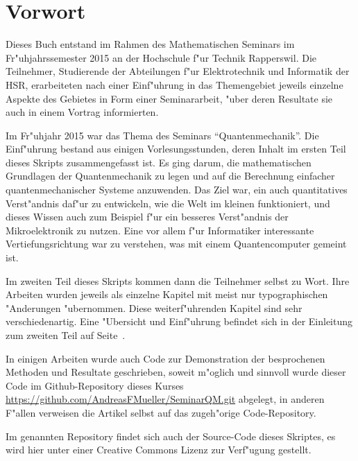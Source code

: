 \chapter*{Vorwort}
\rhead{}
Dieses Buch entstand im Rahmen des Mathematischen Seminars
im Fr"uhjahrssemester 2015 an der Hochschule f"ur Technik Rapperswil.
Die Teilnehmer, Studierende der Abteilungen f"ur Elektrotechnik und
Informatik der
HSR, erarbeiteten nach einer Einf"uhrung in das Themengebiet jeweils
einzelne Aspekte des Gebietes in Form einer Seminararbeit, "uber
deren Resultate sie auch in einem Vortrag informierten. 

Im Fr"uhjahr 2015 war das Thema des Seminars ``Quantenmechanik''.
Die Einf"uhrung bestand aus einigen Vorlesungsstunden, deren
Inhalt im ersten Teil dieses Skripts zusammengefasst ist.
Es ging darum, die mathematischen Grundlagen der Quantenmechanik zu
legen und auf die Berechnung einfacher quantenmechanischer 
Systeme anzuwenden. Das Ziel war, ein auch quantitatives Verst"andnis
daf"ur zu entwickeln, wie die Welt im kleinen funktioniert, und 
dieses Wissen auch zum Beispiel f"ur ein besseres Verst"andnis der
Mikroelektronik zu nutzen. Eine vor allem f"ur Informatiker interessante
Vertiefungsrichtung war zu verstehen, was mit einem Quantencomputer
gemeint ist.

Im zweiten Teil dieses Skripts kommen dann die Teilnehmer
selbst zu Wort. Ihre Arbeiten wurden jeweils als einzelne
Kapitel mit meist nur typographischen "Anderungen "ubernommen.
Diese weiterf"uhrenden Kapitel sind sehr verschiedenartig.
Eine "Ubersicht und Einf"uhrung befindet sich in der Einleitung
zum zweiten Teil auf Seite~\pageref{skript:uebersicht}.

In einigen Arbeiten wurde auch Code zur Demonstration der 
besprochenen Methoden und Resultate geschrieben, soweit
m"oglich und sinnvoll wurde dieser Code im Github-Repository
dieses Kurses \url{https://github.com/AndreasFMueller/SeminarQM.git}
abgelegt, in anderen F"allen verweisen die Artikel selbst auf
das zugeh"orige Code-Repository.

Im genannten Repository findet sich auch der Source-Code dieses
Skriptes, es wird hier unter einer Creative Commons Lizenz
zur Verf"ugung gestellt.


